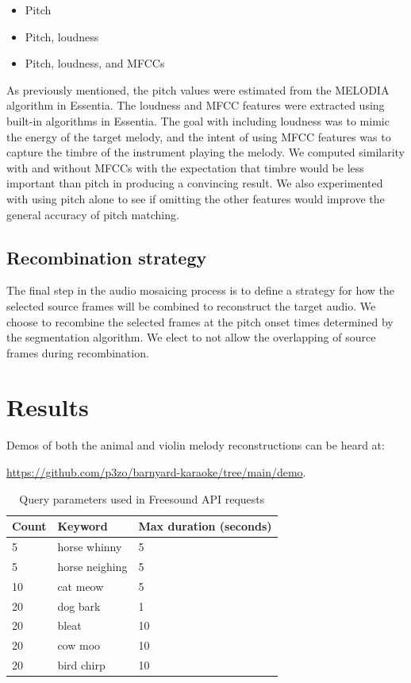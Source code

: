 \documentclass{article}
\begin{document}
\begin{itemize}
  \item Pitch
  \item Pitch, loudness
  \item Pitch, loudness, and MFCCs
\end{itemize}

As previously mentioned, the pitch values were estimated from the MELODIA algorithm in Essentia.
The loudness and MFCC features were extracted using built-in algorithms in Essentia.
The goal with including loudness was to mimic the energy of the target melody, and the intent of using MFCC features was to capture the timbre of the instrument playing the melody.
We computed similarity with and without MFCCs with the expectation that timbre would be less important than pitch in producing a convincing result.
We also experimented with using pitch alone to see if omitting the other features would improve the general accuracy of pitch matching.


\subsection{Recombination strategy}

The final step in the audio mosaicing process is to define a strategy for how the selected source frames will be combined to reconstruct the target audio. We choose to recombine the selected frames at the pitch onset times determined by the segmentation algorithm. We elect to not allow the overlapping of source frames during recombination.

\section{Results}

Demos of both the animal and violin melody reconstructions can be heard at:
	\begin{center}
		\url{https://github.com/p3zo/barnyard-karaoke/tree/main/demo}.
	\end{center}

\begin{table}
    \begin{center}
    \begin{tabular}{@{}lll@{}}
        \toprule
        Count & Keyword & Max duration (seconds) \\
        \midrule
        5 & horse whinny &  5 \\
        5 & horse neighing &  5 \\
        10 & cat meow &  5 \\
        20 & dog bark &  1 \\
        20 & bleat &  10 \\
        20 & cow moo &  10 \\
        20 & bird chirp &  10 \\
        \bottomrule
    \end{tabular}
    \end{center}
    \caption{Query parameters used in Freesound API requests}
    \label{tab:source-collection-queries}
\end{table}
\end{document}
